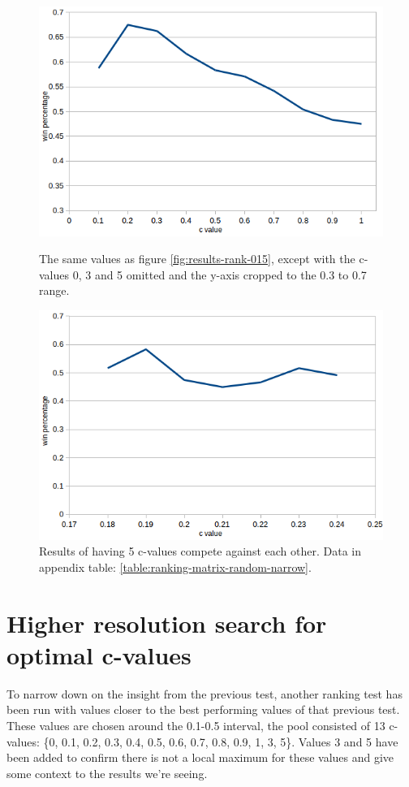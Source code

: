 \documentclass[
11pt, %
english, %
singlespacing, %
headsepline, %
]{MastersDoctoralThesis} %
\begin{document}
\begin{figure}[t]
	\captionsetup{width=.45\textwidth}
	\begin{minipage}[t]{0.49\textwidth}
		\includegraphics[width=\textwidth]{images/rank-01}
		\caption{The same values as figure \ref{fig:results-rank-015}, except with the c-values 0, 3 and 5 omitted and the y-axis cropped to the 0.3 to 0.7 range.}
		\label{fig:results-rank-01}
	\end{minipage}
	\begin{minipage}[t]{0.49\textwidth}
		\includegraphics[width=\textwidth]{images/rank-narrow}
		\caption{Results of having 5 c-values compete against each other. Data in appendix table: \ref{table:ranking-matrix-random-narrow}.}
		\label{fig:results-rank-narrow}
	\end{minipage}
\end{figure}

\section{Higher resolution search for optimal c-values}
\label{section:narrow-ranking}
To narrow down on the insight from the previous test, another ranking test has been run with values closer to the best performing values of that previous test. These values are chosen around the 0.1-0.5 interval, the pool consisted of 13 c-values: \{0, 0.1, 0.2, 0.3, 0.4, 0.5, 0.6, 0.7, 0.8, 0.9, 1, 3, 5\}. Values 3 and 5 have been added to confirm there is not a local maximum for these values and give some context to the results we're seeing.\\
\end{document}
